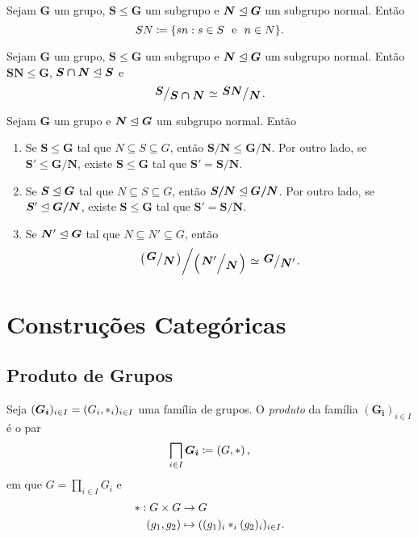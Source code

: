 \begin{defi}
Sejam $\bm G$ um grupo, $\bm S \leq \bm G$ um subgrupo e $\bm N \mathrel{\unlhd} \bm G$ um subgrupo normal. Então
	\begin{equation*}
	SN \coloneqq \{sn : s \in S \e n \in N\}.
	\end{equation*}
\end{defi}

\begin{teo}
Sejam $\bm G$ um grupo, $\bm S \leq \bm G$ um subgrupo e $\bm N \mathrel{\unlhd} \bm G$ um subgrupo normal. Então $\bm{SN} \leq \bm G$, $\bm{S \cap N} \mathrel{\unlhd} \bm S$ e
	\begin{equation*}
	\bm{\quo{S}{S \cap N}} \simeq \bm{\quo{SN}{N}}.
	\end{equation*}
\end{teo}

\begin{teo}
Sejam $\bm G$ um grupo e $\bm N \mathrel{\unlhd} \bm G$ um subgrupo normal. Então
	\begin{enumerate}
	\item Se $\bm S \leq \bm G$ tal que $N \subseteq S \subseteq G$, então $\bm{S/N} \leq \bm{G/N}$. Por outro lado, se $\bm S' \leq \bm{G/N}$, existe $\bm S \leq \bm G$ tal que $\bm S' = \bm{S/N}$.
	\item Se $\bm S \mathrel{\unlhd} \bm G$ tal que $N \subseteq S \subseteq G$, então $\bm{S/N} \mathrel{\unlhd} \bm{G/N}$. Por outro lado, se $\bm S' \mathrel{\unlhd} \bm{G/N}$, existe $\bm S \leq \bm G$ tal que $\bm S' = \bm{S/N}$.
	\item Se $\bm N' \mathrel{\unlhd} \bm G$ tal que $N \subseteq N' \subseteq G$, então
		\begin{equation*}
		\quo{\left(\quo{\bm G}{\bm N}\right)}{\left(\quo{\bm N'}{\bm N}\right)} \simeq \quo{\bm G}{\bm N'}.
		\end{equation*}
	\end{enumerate}
\end{teo}


\cleardoublepage
\section{Construções Categóricas}

\subsection{Produto de Grupos}

\begin{defi}
Seja $(\bm{G_i})_{i \in I}=(G_i,\ast_i)_{i \in I}$ uma família de grupos. O \emph{produto} da família $(\bm{G_i})_{i \in I}$ é o par
	\begin{equation*}
	\prod_{i \in I} \bm{G_i} \coloneqq \left(G, \opb\right),
	\end{equation*}
em que $G = \prod_{i \in I} G_i$ e
	\begin{align*}
	\ast: G \times G &\to G \\
				(g_1,g_2) &\mapsto ((g_1)_i \ast_i (g_2)_i)_{i \in I}.
	\end{align*}
\end{defi}

